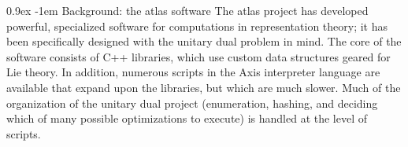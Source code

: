 \documentclass{easychair}
\makeatletter
\def\atlas{\textsf{atlas}\xspace}
\def\axis{\textsf{Axis}\xspace}
\renewcommand\paragraph{\@startsection{paragraph}{4}{\z@}%
  {0.9ex}   %
  {-1em}    %
  {\normalfont\normalsize\bfseries}}
\makeatother
\begin{document}
\paragraph{Background: the \atlas{} software}
The \atlas{} project \cite{AtlasProject} has developed powerful, specialized software for computations in representation theory; it has been specifically designed with the unitary dual problem in mind.  The core of the software consists of C++ libraries, which use custom data structures geared for Lie theory.  In addition, numerous scripts in the \axis{} interpreter language are available that expand upon the libraries, but which are much slower.  Much of the organization of the unitary dual project (enumeration, hashing, and deciding which of many possible optimizations to execute) is handled at the level of scripts.
%

\end{document}
